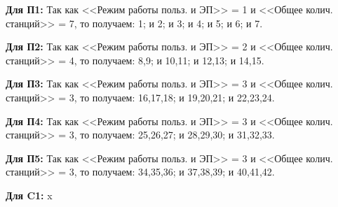\documentclass[12pt, a4paper, simple]{eskdtext}
\begin{document}
    \textbf{Для П1:} Так как <<Режим работы польз. и ЭП>> = 1 и <<Общее колич. станций>> = 7,
    то получаем: 1; и 2; и 3; и 4; и 5; и 6; и 7.

    \textbf{Для П2:} Так как <<Режим работы польз. и ЭП>> = 2 и <<Общее колич. станций>> = 4,
    то получаем: 8,9; и 10,11; и 12,13; и 14,15.

    \textbf{Для П3:} Так как <<Режим работы польз. и ЭП>> = 3 и <<Общее колич. станций>> = 3,
    то получаем: 16,17,18; и 19,20,21; и 22,23,24.

    \textbf{Для П4:} Так как <<Режим работы польз. и ЭП>> = 3 и <<Общее колич. станций>> = 3,
    то получаем: 25,26,27; и 28,29,30; и 31,32,33.

    \textbf{Для П5:} Так как <<Режим работы польз. и ЭП>> = 3 и <<Общее колич. станций>> = 3,
    то получаем: 34,35,36; и 37,38,39; и 40,41,42.

    \textbf{Для C1:} x
\end{document}
